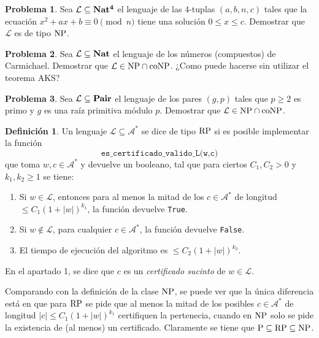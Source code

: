\documentclass[a4paper, 11pt]{article}
\newcommand{\Alf}{\mathcal{A}}
\newcommand{\Lan}{\mathcal{L}}
\newcounter{numerodetema}
\theoremstyle{plain}
\theoremstyle{definition}
\newtheorem{defi}[teor]{Definición}
\newtheorem{prob}{Problema}[numerodetema]
\begin{document}
\bigskip

\begin{prob}
Sea $\Lan\subseteq{\bf Nat^4}$ el lenguaje de las $4$-tuplas $(a,b,n,c)$ tales que
la ecuación $x^2+ax+b\equiv 0\pmod{n}$ tiene una solución $0\leq x\leq c$. Demostrar
que $\Lan$ es de tipo ${\rm NP}$.
\end{prob}

\begin{prob}
Sea $\Lan\subseteq{\bf Nat}$ el lenguaje de los números (compuestos) de Carmichael.
Demostrar que $\Lan\in{\rm NP}\cap{\rm coNP}$. ¿Como puede hacerse sin utilizar el
teorema AKS?
\end{prob}

\begin{prob}
Sea $\Lan\subseteq{\bf Pair}$ el lenguaje de los pares $(g,p)$ tales que $p\geq 2$
es primo y $g$ es una raíz primitiva módulo $p$. Demostrar que $\Lan\in{\rm NP}
\cap{\rm coNP}$.
\end{prob}

\bigskip

\begin{defi}\label{defRP}
Un lenguaje $\Lan\subseteq\Alf^*$ se dice de tipo ${\rm RP}$ si es posible implementar la
función
\[
   \texttt{es\_certificado\_valido\_L(w,c)}
\]
que toma $w,c\in\Alf^*$ y devuelve un booleano, tal que para ciertos $C_1,C_2>0$ y
$k_1,k_2\geq 1$ se tiene:
\begin{enumerate}
\item Si $w\in\Lan$, entonces para al menos la mitad de los $c\in\Alf^*$ de longitud
$\leq C_1(1+|w|)^{k_1}$, la función devuelve \texttt{True}.
\item Si $w\not\in\Lan$, para cualquier $c\in\Alf^*$, la función devuelve \texttt{False}.
\item El tiempo de ejecución del algoritmo es $\leq C_2(1+|w|)^{k_2}$.
\end{enumerate}
En el apartado 1, se dice que $c$ es un \emph{certificado sucinto} de $w\in\Lan$.
\end{defi}

Comparando con la definición de la clase ${\rm NP}$, se puede ver que la única diferencia
está en que para ${\rm RP}$ se pide que al menos la mitad de los posibles $c\in\Alf^*$
de longitud $|c|\leq C_1(1+|w|)^{k_1}$ certifiquen la pertenecia, cuando en ${\rm NP}$
solo se pide la existencia de (al menos) un certificado. Claramente se tiene que
${\rm P}\subseteq{\rm RP}\subseteq{\rm NP}$.

\bigskip
\end{document}
